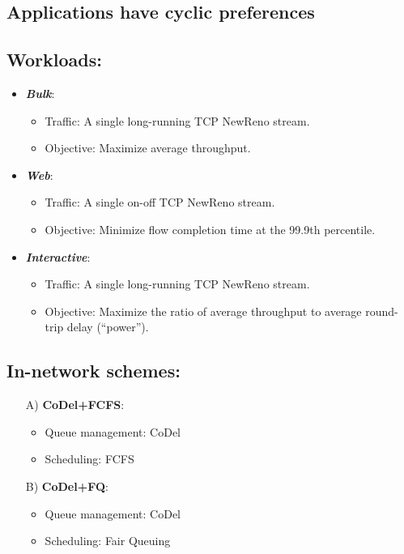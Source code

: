 {\begin{multicols}{2}
\section*{Applications have cyclic preferences}
\subsection*{Workloads:}
\begin{itemize}

\item \textbf{\emph{Bulk}}: 
  \begin{itemize}
  \item Traffic: A single long-running TCP NewReno stream.
  \item Objective: Maximize average throughput.
  \end{itemize}

\item \textbf{\emph{Web}}:
  \begin{itemize}
  \item Traffic: A single on-off TCP NewReno stream.
  \item Objective: Minimize flow completion time at the 99.9th percentile.
  \end{itemize}

\item \textbf{\emph{Interactive}}:
  \begin{itemize}
  \item Traffic: A single long-running TCP NewReno stream.
  \item Objective: Maximize the ratio of average throughput to average
  round-trip delay (``power'').
  \end{itemize}

\end{itemize}


\subsection*{In-network schemes:}
\begin{enumerate}

\item[A)] {\bf CoDel+FCFS}:
  \begin{itemize}
  \item Queue management: CoDel
  \item Scheduling: FCFS
  \end{itemize}

\item[B)] {\bf CoDel+FQ}:
  \begin{itemize}
  \item Queue management: CoDel
  \item Scheduling: Fair Queuing
  \end{itemize}


\end{enumerate}
\end{multicols}}
